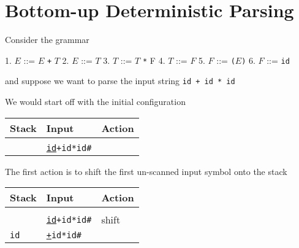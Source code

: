 \documentclass[8pt,a4paper,compress]{beamer}
\newcommand{\mm}[1]{$#1$}
\newenvironment{spaced}
{
\smallskip
\hspace{.5cm}
\begin{minipage}[c]{\textwidth}
}
{
\end{minipage}
\smallskip
}
\begin{document}
\section{Bottom-up Deterministic Parsing}
\begin{frame}[fragile]
\pause

Consider the grammar

\text{ }
\begin{spaced}
\begin{production}
1. \mm{E} ::= \mm{E} \lstinline{+} \mm{T}
2. \mm{E} ::= \mm{T}
3. \mm{T} ::= \mm{T} \lstinline{*} {F}
4. \mm{T} ::= \mm{F}
5. \mm{F} ::= \lstinline{(}\mm{E}\lstinline{)}
6. \mm{F} ::= \lstinline{id}
\end{production}
\end{spaced}


and suppose we want to parse the input string \lstinline{id + id * id}

\pause
\bigskip

We would start off with the initial configuration 

\begin{table}[H]
\begin{tabular}{lll}
Stack & Input & Action \\ \hline \\
& \underline{\lstinline$id$}\lstinline$+id*id#$ &
\end{tabular}
\end{table}

\pause
\bigskip

The first action is to shift the first un-scanned input symbol onto the stack

\begin{table}[H]
\begin{tabular}{lll}
Stack & Input & Action \\ \hline \\
& \underline{\lstinline$id$}\lstinline$+id*id#$ & shift \\
\lstinline$id$ & \underline{\lstinline$+$}\lstinline$id*id#$ &
\end{tabular}
\end{table}
\end{frame}
\end{document}
